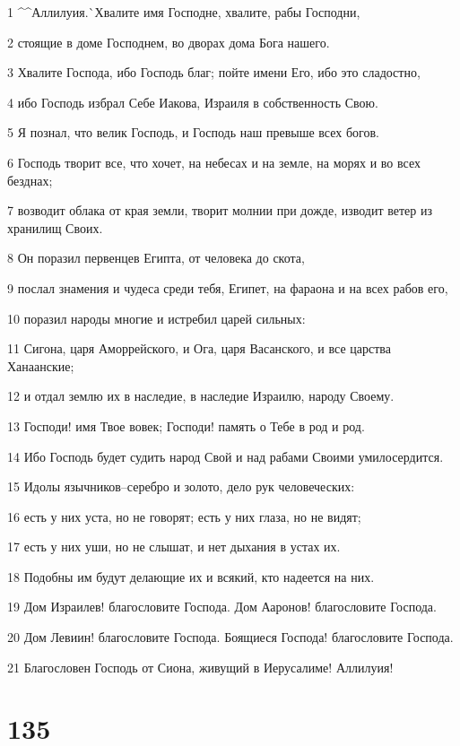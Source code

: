 \par 1 ^^Аллилуия.^^ Хвалите имя Господне, хвалите, рабы Господни,
\par 2 стоящие в доме Господнем, во дворах дома Бога нашего.
\par 3 Хвалите Господа, ибо Господь благ; пойте имени Его, ибо это сладостно,
\par 4 ибо Господь избрал Себе Иакова, Израиля в собственность Свою.
\par 5 Я познал, что велик Господь, и Господь наш превыше всех богов.
\par 6 Господь творит все, что хочет, на небесах и на земле, на морях и во всех безднах;
\par 7 возводит облака от края земли, творит молнии при дожде, изводит ветер из хранилищ Своих.
\par 8 Он поразил первенцев Египта, от человека до скота,
\par 9 послал знамения и чудеса среди тебя, Египет, на фараона и на всех рабов его,
\par 10 поразил народы многие и истребил царей сильных:
\par 11 Сигона, царя Аморрейского, и Ога, царя Васанского, и все царства Ханаанские;
\par 12 и отдал землю их в наследие, в наследие Израилю, народу Своему.
\par 13 Господи! имя Твое вовек; Господи! память о Тебе в род и род.
\par 14 Ибо Господь будет судить народ Свой и над рабами Своими умилосердится.
\par 15 Идолы язычников--серебро и золото, дело рук человеческих:
\par 16 есть у них уста, но не говорят; есть у них глаза, но не видят;
\par 17 есть у них уши, но не слышат, и нет дыхания в устах их.
\par 18 Подобны им будут делающие их и всякий, кто надеется на них.
\par 19 Дом Израилев! благословите Господа. Дом Ааронов! благословите Господа.
\par 20 Дом Левиин! благословите Господа. Боящиеся Господа! благословите Господа.
\par 21 Благословен Господь от Сиона, живущий в Иерусалиме! Аллилуия!

\chapter{135}

